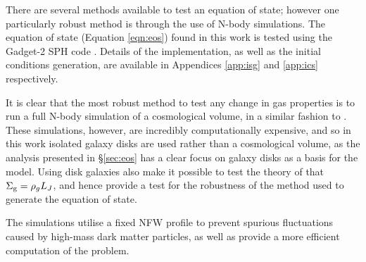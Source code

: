 There are several methods available to test an equation of state; however one particularly robust method is through the use of N-body simulations.
The equation of state (Equation \ref{eqn:eos}) found in this work is tested using the Gadget-2 SPH code \citep{springel_cosmological_2005}.
Details of the implementation, as well as the initial conditions generation, are available in Appendices \ref{app:isg} and \ref{app:ics} respectively.

It is clear that the most robust method to test any change in gas properties is to run a full N-body simulation of a cosmological volume, in a similar fashion to \citet{schaye_eagle_2015, volksberger_introducing_2014}.
These simulations, however, are incredibly computationally expensive, and so in this work isolated galaxy disks are used rather than a cosmological volume, as the analysis presented in \S \ref{sec:eos} has a clear focus on galaxy disks as a basis for the model.
Using disk galaxies also make it possible to test the theory of \citet{schaye_model-independent_2001} that $\Sigma_\mathrm{g} = \rho_g L_J$, and hence provide a test for the robustness of the method used to generate the equation of state.

The simulations utilise a fixed NFW profile \citep{coe_dark_2010, navarro_structure_1996} to prevent spurious fluctuations caused by high-mass dark matter particles, as well as provide a more efficient computation of the problem.

